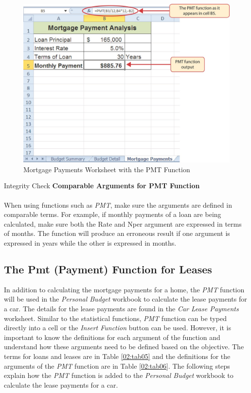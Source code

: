 \begin{figure}[H]
	\centering
	\includegraphics[width=\maxwidth{.95\linewidth}]{gfx/ch02_fig33}
	\caption{Mortgage Payments Worksheet with the PMT Function}
	\label{02:fig33}
\end{figure}

\begin{center}
	\begin{infobox}{Integrity Check}
		\textbf{Comparable Arguments for PMT Function}
		\\
		\\
		When using functions such as \textit{PMT}, make sure the arguments are defined in comparable terms. For example, if monthly payments of a loan are being calculated, make sure both the Rate and Nper argument are expressed in terms of months. The function will produce an erroneous result if one argument is expressed in years while the other is expressed in months.
	\end{infobox}
\end{center}

\subsection{The Pmt (Payment) Function for Leases}

In addition to calculating the mortgage payments for a home, the \textit{PMT} function will be used in the \textit{Personal Budget} workbook to calculate the lease payments for a car. The details for the lease payments are found in the \textit{Car Lease Payments} worksheet. Similar to the statistical functions, \textit{PMT} function can be typed directly into a cell or the \textit{Insert Function} button can be used. However, it is important to know the definitions for each argument of the function and understand how these arguments need to be defined based on the objective. The terms for loans and leases are in Table \ref{02:tab05} and the definitions for the arguments of the \textit{PMT} function are in Table \ref{02:tab06}. The following steps explain how the \textit{PMT} function is added to the \textit{Personal Budget} workbook to calculate the lease payments for a car.

